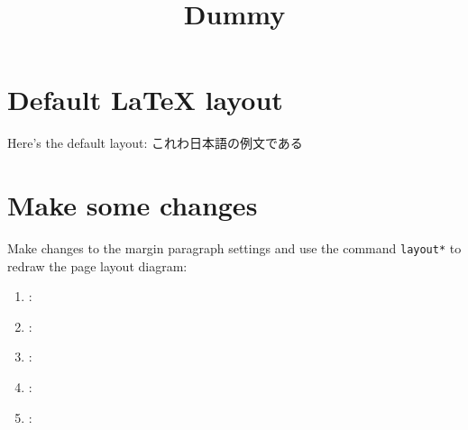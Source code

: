 \documentclass{report}
\title{Dummy}
\begin{document}
\section{Default \LaTeX{} layout}
Here's the default layout: これわ日本語の例文である

\layout
\section{Make some changes}
Make changes to the margin paragraph settings and use the command \verb|layout*| to redraw the page layout diagram:
\vspace{10pt}
\setlength{\marginparwidth}{0pt}
\setlength{\marginparsep}{0pt}

\layout*
\newcommand\printvalue[1]{\texttt{\string #1} : \the #1}
\begin{enumerate}[labelwidth=10pt,labelsep=2pt,itemindent=\labelwidth+\labelsep]
  \DrawEnumitemLabel\item \printvalue{}
  \item \printvalue{}
  \item \printvalue{}
  \item \printvalue\itemindent
  \item \printvalue\leftmargin
\end{enumerate}
\end{document}
